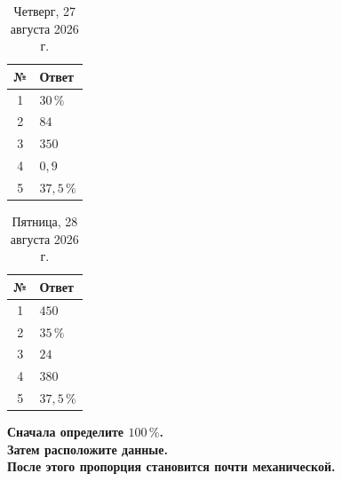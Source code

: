 \documentclass[a4paper,12pt]{article}
\newcommand{\pct}[1]{#1\,\%}
\begin{document}
\vspace{0.8cm}

\begin{table}[h]
\centering
\caption{Четверг, 27 августа 2026 г.}
\begin{tabularx}{0.82\linewidth}{c X}
\toprule
\textbf{№} & \textbf{Ответ} \\
\midrule
1 & \(\pct{30}\) \\
2 & \(84\) \\
3 & \(350\) \\
4 & \(0{,}9\) \\
5 & \(\pct{37,5}\) \\
\bottomrule
\end{tabularx}
\end{table}

\vspace{0.8cm}

\begin{table}[h]
\centering
\caption{Пятница, 28 августа 2026 г.}
\begin{tabularx}{0.82\linewidth}{c X}
\toprule
\textbf{№} & \textbf{Ответ} \\
\midrule
1 & \(450\) \\
2 & \(\pct{35}\) \\
3 & \(24\) \\
4 & \(380\) \\
5 & \(\pct{37,5}\) \\
\bottomrule
\end{tabularx}
\end{table}

\vfill

\begin{center}
\textcolor{darkaccent}{
\textbf{
Сначала определите \(\pct{100}\).\\
Затем расположите данные.\\
После этого пропорция становится почти механической.
}}
\end{center}
\end{document}
